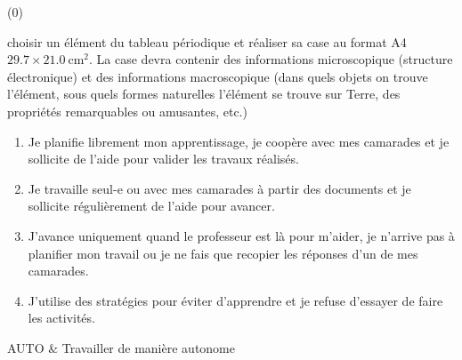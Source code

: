 \vspace*{-354 pt}

\begin{programmeSeance}
\end{programmeSeance}

\begin{programmeSeance}
\end{programmeSeance}

\begin{programmeSeance}[2](0)
\end{programmeSeance}


\begin{tacheFinale}
   choisir un élément du tableau périodique et réaliser sa case au format A4 $\num{29,7} \times\qty{21,0}{\cm\squared}$.
  La case devra contenir des informations microscopique (structure électronique) et des informations macroscopique (dans quels objets on trouve l'élément, sous quels formes naturelles l'élément se trouve sur Terre, des propriétés remarquables ou amusantes, etc.)
\end{tacheFinale}




\begin{enumerate}[label = \Alph*]
  \item Je planifie librement mon apprentissage, je coopère avec mes camarades et je sollicite de l'aide pour valider les travaux réalisés.
  \item Je travaille seul-e ou avec mes camarades à partir des documents et je sollicite régulièrement de l'aide pour avancer.
  \item J'avance uniquement quand le professeur est là pour m'aider, je n'arrive pas à planifier mon travail ou je ne fais que recopier les réponses d'un de mes camarades.
  \item J'utilise des stratégies pour éviter d'apprendre et je refuse d'essayer de faire les activités.
\end{enumerate}

\begin{tableauCompetences}
  AUTO & Travailler de manière autonome \\
\end{tableauCompetences}
